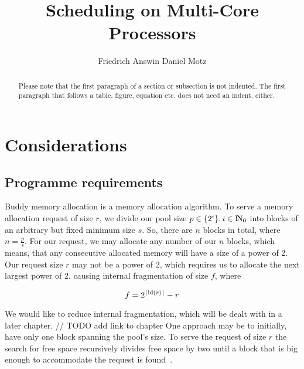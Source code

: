 \documentclass[runningheads]{llncs}
\DeclarePairedDelimiter\ceil{\lceil}{\rceil}
\begin{document}
%
\title{Scheduling on Multi-Core Processors}
%
%
\author{Friedrich Answin Daniel Motz}
%
%
%
\maketitle              %
%
\begin{abstract}
Please note that the first paragraph of a section or subsection is
not indented. The first paragraph that follows a table, figure,
equation etc. does not need an indent, either.

\end{abstract}
%
%
%
\section{Considerations}
\subsection{Programme requirements}
Buddy memory allocation is a memory allocation algorithm. To serve a memory
allocation request of size $r$, we divide our pool size 
$p \in \{2^i\}, i \in {\rm I\!N}_0$ into blocks of 
an arbitrary but fixed minimum size $s$. So, there are $n$ blocks in total,
where $n = \frac{p}{s}$.
For our request, we may allocate any number of our $n$ blocks, which means,
that any consecutive allocated memory will have a size of a power of 2.
Our request size $r$ may not be a power of 2, which requires us to allocate 
the next largest power of 2, causing internal fragmentation of size $f$, where

\[ f = 2^{\ceil{\text{ld}(r)}} - r \]

We would like to reduce internal fragmentation, which will be dealt with in a 
later chapter. // TODO add link to chapter
One approach may be to initially, have only one block spanning the pool's size.
To serve the request of size $r$ the search for free space recursively divides
free space by two until a block that is big enough to accommodate the request 
is found~\cite{ostep}.
\end{document}
